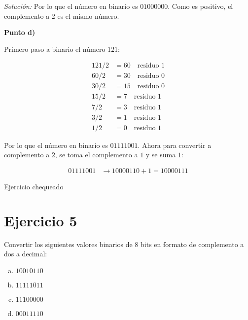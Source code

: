 \documentclass{article}
\newenvironment{solution}
    {\textit{Solución:}}
    {}
\begin{document}
\begin{solution}
Por lo que el número en binario es $01000000$. Como es positivo, el complemento a $2$ es el mismo número.

\textbf{Punto d)}

Primero paso a binario el número $121$:

\begin{align*}
    121/2 &= 60 \quad \text{residuo } 1\\
    60/2 &= 30 \quad \text{residuo } 0\\
    30/2 &= 15 \quad \text{residuo } 0\\
    15/2 &= 7 \quad \text{residuo } 1\\
    7/2 &= 3 \quad \text{residuo } 1\\
    3/2 &= 1 \quad \text{residuo } 1\\
    1/2 &= 0 \quad \text{residuo } 1
\end{align*}

Por lo que el número en binario es $01111001$. Ahora para convertir a complemento a $2$, se toma el complemento a $1$ y se suma $1$:

\begin{align*}
    01111001 &\rightarrow 10000110 + 1 = 10000111
\end{align*}
\end{solution}

{\color{green} Ejercicio chequeado}

\section*{Ejercicio 5}
Convertir los siguientes valores binarios de 8 bits en formato de complemento a dos a decimal:

\begin{enumerate}[a)]
    \item $10010110$
    \item $11111011$
    \item $11100000$
    \item $00011110$
\end{enumerate}
\end{document}
